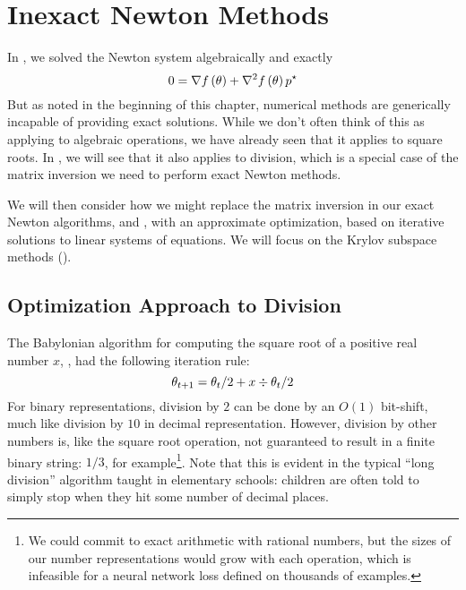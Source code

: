 \documentclass[../../thesis.tex]{subfiles}
\begin{document}
\section{Inexact Newton Methods}

In ,
we solved the Newton system algebraically and exactly
\begin{equation}
	0 = \nabla f\left(\theta\right) + \nabla^2f\left(\theta\right)p^\star
\end{equation}
\noindent
But as noted in the beginning of this chapter,
numerical methods are generically incapable of providing exact solutions.
While we don't often think of this as applying to algebraic operations,
we have already seen that it applies to square roots.
In ,
we will see that it also applies to division,
which is a special case of the matrix inversion
we need to perform exact Newton methods.

We will then consider how we might replace the matrix inversion
in our exact Newton algorithms,  and ,
with an approximate optimization,
based on iterative solutions to linear systems of equations.
We will focus on the Krylov subspace methods
().

\subsection{Optimization Approach to Division}

The Babylonian algorithm for computing the square root
of a positive real number $x$,
,
had the following iteration rule:
\begin{equation}\equationlabel{babylon-iter}
	\theta_{t+1} = \theta_t / 2 + x \div \theta_t / 2
\end{equation}
\noindent For binary representations,
division by $2$ can be done by an $O(1)$ bit-shift,
much like division by $10$ in decimal representation.
However, division by other numbers is,
like the square root operation,
not guaranteed to result in a finite binary string:
$1/3$, for example\footnote{%
We could commit to exact arithmetic with rational numbers,
but the sizes of our number representations would grow with each operation,
which is infeasible for a neural network loss
defined on thousands of examples.}.
Note that this is evident in the typical
\enquote{long division} algorithm
taught in elementary schools:
children are often told to simply stop when they
hit some number of decimal places.
\end{document}
